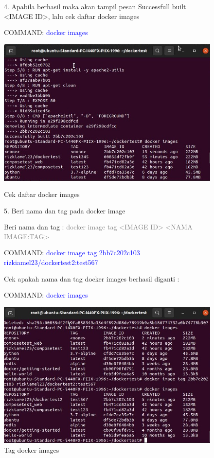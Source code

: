 \begin{figure}
4. Apabila berhasil maka akan tampil pesan Successfull built <IMAGE ID>, lalu cek daftar docker images

COMMAND: \textcolor{Blue}{docker images}
    \begin{center}
        \includegraphics[width=\linewidth]{image/23.jpg}
        \caption{Cek daftar docker images}
        \label{fig:my_figure}
    \end{center}

5. Beri nama dan tag pada docker image

Beri nama dan tag : \textcolor{Gray}{docker image tag <IMAGE ID> <NAMA IMAGE:TAG>}

COMMAND: \textcolor{Blue}{docker image tag 2bb7c202c103 
rizkiamel23/dockertest2:test567}

Cek apakah nama dan tag docker images berhasil diganti :

COMMAND: \textcolor{Blue}{docker images}
    \begin{center}
        \includegraphics[width=\linewidth]{image/25.jpg}
        \caption{Tag docker images}
        \label{fig:my_figure}
    \end{center}
\end{figure}

